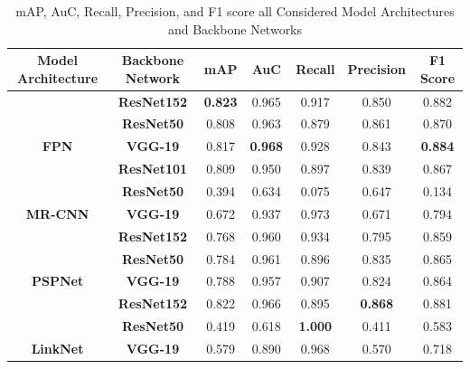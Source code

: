 \documentclass[a4paper,12pt]{spieman}  %
\begin{document}
\begin{spacing}{1}
\bgroup
\def\arraystretch{1.1}%
\begin{table}[]
\centering
\caption{mAP, AuC, Recall, Precision, and F1 score all Considered Model Architectures and Backbone Networks}
\label{tab:results2}
\begin{tabular}{|c|c|c|c|c|c|c|}
\hline
\textbf{Model Architecture} &
  \textbf{Backbone Network} &
  \textbf{mAP} &
  \textbf{AuC} &
  \textbf{Recall} &
  \textbf{Precision} &
  \textbf{F1 Score} \\ \hline
                                 & \textbf{ResNet152} & \textbf{0.823} & 0.965 & 0.917 & 0.850  & 0.882          \\ \cline{2-7}
                                 & \textbf{ResNet50}   & 0.808          & 0.963 & 0.879 & 0.861  & 0.870           \\ \cline{2-7}
\multirow{-3}{*}{\textbf{FPN}}   & \textbf{VGG-19}     & 0.817          & \textbf{0.968} & 0.928 & 0.843 & \textbf{0.884}\\ \hline
                                 & \textbf{ResNet101} & 0.809          & 0.950 & 0.897 & 0.839          & 0.867          \\ \cline{2-7}
                                 & \textbf{ResNet50}   & 0.394          & 0.634 & 0.075 & 0.647 & 0.134     \\ \cline{2-7}
\multirow{-3}{*}{\textbf{MR-CNN}} & \textbf{VGG-19}     & 0.672          & 0.937 & 0.973 & 0.671 & 0.794         \\ \hline
                                  &  \textbf{ResNet152} &   0.768 &   0.960 &   0.934 &   0.795 &
  0.859        \\ \cline{2-7}
                                 & \textbf{ResNet50}   & 0.784          & 0.961 & 0.896 & 0.835          & 0.865          \\ \cline{2-7}
\multirow{-3}{*}{\textbf{PSPNet}} & \textbf{VGG-19}     & 0.788          & 0.957 & 0.907 & 0.824          & 0.864  \\ \hline
{\color[HTML]{222222} }          & \textbf{ResNet152}  & 0.822          & 0.966 & 0.895 & \textbf{0.868} & 0.881          \\ \cline{2-7}
{\color[HTML]{222222} }          &   \textbf{ResNet50} &   0.419 &   0.618 &   \textbf{1.000} &   0.411 &   0.583      \\ \cline{2-7}
\multirow{-3}{*}{{\color[HTML]{222222} \textbf{LinkNet}}} & \textbf{VGG-19}     & 0.579          & 0.890 & 0.968 & 0.570          & 0.718     \\ \hline
\end{tabular}

\end{table}
\end{spacing}
\end{document}
